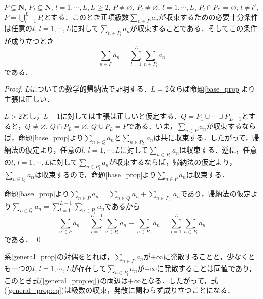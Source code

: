 \documentclass[12pt,a4paper]{jsarticle}
\newcommand{\nat}{\mathbf{N}}
\begin{document}
\begin{corollary}\label{general_prop}
    $P \subseteq \nat$, $P_l \subseteq \nat$, $l = 1, \cdots, L, L \geq 2$, $P \not= \varnothing$, $P_l \not= \varnothing$, $l = 1, \cdots, L$, $P_l \cap P_{l'} = \varnothing$, $l \not= l'$, $P = \bigcup_{l = 1}^L P_l$とする．このとき正項級数$\sum_{n \in P} a_n$が収束するための必要十分条件は任意の$l$, $l = 1, \cdots, L$に対して$\sum_{n \in P_l} a_n$が収束することである．そしてこの条件が成り立つとき
    \begin{equation}
        \sum_{n \in P} a_n = \sum_{l = 1}^L \sum_{n \in P_l} a_n \label{general_prop:eq}
    \end{equation}
    である．
\end{corollary}
\begin{proof}
    $L$についての数学的帰納法で証明する．$L = 2$ならば命題\ref{base_prop}より主張は正しい．

    $L > 2$とし，$L - 1$に対しては主張は正しいと仮定する．$Q = P_1 \cup \cdots \cup P_{L - 1}$とすると，$Q \not= \varnothing$, $Q \cap P_L = \varnothing$, $Q \cup P_L = P$である．いま，$\sum_{n \in P} a_n$が収束するならば，命題\ref{base_prop}より$\sum_{n \in Q} a_n$と$\sum_{n \in P_L} a_n$は共に収束する．したがって，帰納法の仮定より，任意の$l$, $l = 1, \cdots, L$に対して$\sum_{n \in P_l} a_n$は収束する．逆に，任意の$l$, $l = 1, \cdots, L$に対して$\sum_{n \in P_l} a_n$が収束するならば，帰納法の仮定より，$\sum_{n \in Q} a_n$は収束するので，命題\ref{base_prop}より$\sum_{n \in P} a_n$は収束する．

    命題\ref{base_prop}より$\sum_{n \in P} a_n = \sum_{n \in Q} a_n + \sum_{n \in P_L} a_n$であり，帰納法の仮定より$\sum_{n \in Q} a_n = \sum_{l = 1}^{L - 1} \sum_{n \in P_l} a_n$であるから
    \begin{equation*}
        \sum_{n \in P} a_n = \sum_{l = 1}^{L - 1} \sum_{n \in P_l} a_n + \sum_{n \in P_L} a_n = \sum_{l = 1}^L \sum_{n \in P_l} a_n
    \end{equation*}
    である．
    \qed
\end{proof}

系\ref{general_prop}の対偶をとれば，$\sum_{n \in P} a_n$が$+\infty$に発散することと，少なくとも一つの$l$, $l = 1, \cdots, L$が存在して$\sum_{n \in P_l} a_n$が$+\infty$に発散することは同値であり，このとき式(\ref{general_prop:eq})の両辺は$+\infty$となる．したがって，式(\ref{general_prop:eq})は級数の収束，発散に関わらず成り立つことになる．
\end{document}
